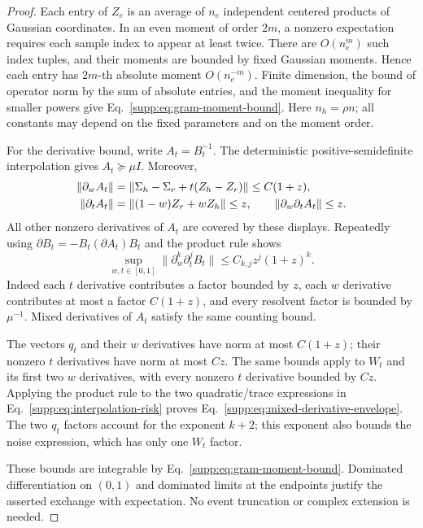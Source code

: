 \begin{proof}
Each entry of $Z_e$ is an average of $n_e$ independent centered products of Gaussian coordinates. In an even moment of order $2m$, a nonzero expectation requires each sample index to appear at least twice. There are $O(n_e^m)$ such index tuples, and their moments are bounded by fixed Gaussian moments. Hence each entry has $2m$-th absolute moment $O(n_e^{-m})$. Finite dimension, the bound of operator norm by the sum of absolute entries, and the moment inequality for smaller powers give Eq.~\eqref{supp:eq:gram-moment-bound}. Here $n_h=\rho n$; all constants may depend on the fixed parameters and on the moment order.

For the derivative bound, write $A_t=B_t^{-1}$. The deterministic positive-semidefinite interpolation gives $A_t\succeq\mu I$. Moreover,
\begin{align}
 \|\partial_w A_t\|&=\|\Sigma_h-\Sigma_r+t(Z_h-Z_r)\|\le C(1+z),\notag\\
 \|\partial_t A_t\|&=\|(1-w)Z_r+wZ_h\|\le z,\qquad
 \|\partial_w\partial_t A_t\|\le z.
\end{align}
All other nonzero derivatives of $A_t$ are covered by these displays. Repeatedly using $\partial B_t=-B_t(\partial A_t)B_t$ and the product rule shows
\begin{equation}
 \sup_{w,t\in[0,1]}\|\partial_w^k\partial_t^jB_t\|
 \le C_{k,j}z^j(1+z)^k.
\end{equation}
Indeed each $t$ derivative contributes a factor bounded by $z$, each $w$ derivative contributes at most a factor $C(1+z)$, and every resolvent factor is bounded by $\mu^{-1}$. Mixed derivatives of $A_t$ satisfy the same counting bound.

The vectors $q_t$ and their $w$ derivatives have norm at most $C(1+z)$; their nonzero $t$ derivatives have norm at most $Cz$. The same bounds apply to $W_t$ and its first two $w$ derivatives, with every nonzero $t$ derivative bounded by $Cz$. Applying the product rule to the two quadratic/trace expressions in Eq.~\eqref{supp:eq:interpolation-risk} proves Eq.~\eqref{supp:eq:mixed-derivative-envelope}. The two $q_t$ factors account for the exponent $k+2$; this exponent also bounds the noise expression, which has only one $W_t$ factor.

These bounds are integrable by Eq.~\eqref{supp:eq:gram-moment-bound}. Dominated differentiation on $(0,1)$ and dominated limits at the endpoints justify the asserted exchange with expectation. No event truncation or complex extension is needed.
\end{proof}

